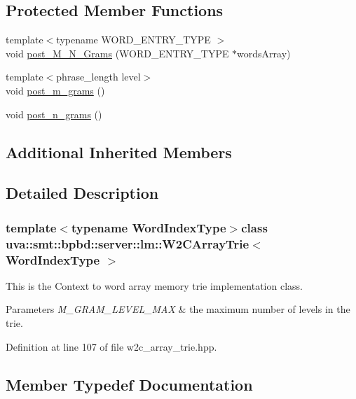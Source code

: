 \subsection*{Protected Member Functions}
\begin{DoxyCompactItemize}
\item 
{\footnotesize template$<$typename W\+O\+R\+D\+\_\+\+E\+N\+T\+R\+Y\+\_\+\+T\+Y\+P\+E $>$ }\\void \hyperlink{classuva_1_1smt_1_1bpbd_1_1server_1_1lm_1_1_w2_c_array_trie_a1572e4b7eb6e773e28d13cef6f0672a1}{post\+\_\+\+M\+\_\+\+N\+\_\+\+Grams} (W\+O\+R\+D\+\_\+\+E\+N\+T\+R\+Y\+\_\+\+T\+Y\+P\+E $\ast$words\+Array)
\item 
{\footnotesize template$<$phrase\+\_\+length level$>$ }\\void \hyperlink{classuva_1_1smt_1_1bpbd_1_1server_1_1lm_1_1_w2_c_array_trie_a1b4a73220bb1ab5c839466fef92dba2f}{post\+\_\+m\+\_\+grams} ()
\item 
void \hyperlink{classuva_1_1smt_1_1bpbd_1_1server_1_1lm_1_1_w2_c_array_trie_a2b213b3bc8e79659cecf736b376dc9c7}{post\+\_\+n\+\_\+grams} ()
\end{DoxyCompactItemize}
\subsection*{Additional Inherited Members}


\subsection{Detailed Description}
\subsubsection*{template$<$typename Word\+Index\+Type$>$class uva\+::smt\+::bpbd\+::server\+::lm\+::\+W2\+C\+Array\+Trie$<$ Word\+Index\+Type $>$}

This is the Context to word array memory trie implementation class.


\begin{DoxyParams}{Parameters}
{\em M\+\_\+\+G\+R\+A\+M\+\_\+\+L\+E\+V\+E\+L\+\_\+\+M\+A\+X} & the maximum number of levels in the trie. \\
\hline
\end{DoxyParams}


Definition at line 107 of file w2c\+\_\+array\+\_\+trie.\+hpp.



\subsection{Member Typedef Documentation}
\hypertarget{classuva_1_1smt_1_1bpbd_1_1server_1_1lm_1_1_w2_c_array_trie_ad13c0f47859d030152254340a71d26b8}{}
